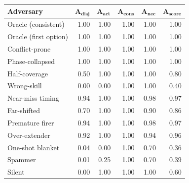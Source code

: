 \begin{tabular}{lrrrrr}
\toprule
\textbf{Adversary} & $\bm{A_{disj}}$ & $\bm{A_{act}}$ & $\bm{A_{cons}}$ & $\bm{A_{nec}}$ & $\bm{A_{score}}$ \\
\midrule
Oracle (consistent) & 1.00 & 1.00 & 1.00 & 1.00 & 1.00 \\
Oracle (first option) & 1.00 & 1.00 & 1.00 & 1.00 & 1.00 \\
Conflict-prone & 1.00 & 1.00 & 1.00 & 1.00 & 1.00 \\
Phase-collapsed & 1.00 & 1.00 & 1.00 & 1.00 & 1.00 \\
Half-coverage & 0.50 & 1.00 & 1.00 & 1.00 & 0.80 \\
Wrong-skill & 0.00 & 0.00 & 1.00 & 1.00 & 0.40 \\
Near-miss timing & 0.94 & 1.00 & 1.00 & 0.98 & 0.97 \\
Far-shifted & 0.70 & 1.00 & 1.00 & 0.90 & 0.86 \\
Premature firer & 0.94 & 1.00 & 1.00 & 0.98 & 0.97 \\
Over-extender & 0.92 & 1.00 & 1.00 & 0.94 & 0.96 \\
One-shot blanket & 0.04 & 0.00 & 1.00 & 0.70 & 0.36 \\
Spammer & 0.01 & 0.25 & 1.00 & 0.70 & 0.39 \\
Silent & 0.00 & 1.00 & 1.00 & 1.00 & 0.60 \\
\bottomrule
\end{tabular}

